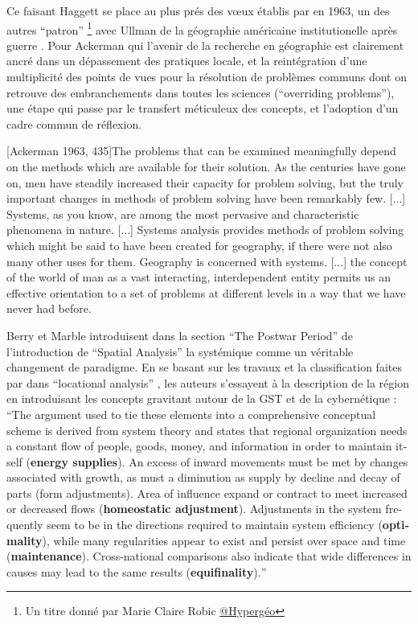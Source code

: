 Ce faisant Haggett se place au plus prés des vœux établis par \textcite{Ackerman1963} en 1963, un des autres \enquote{patron} \footnote{Un titre donné par Marie Claire Robic \href{http://www.hypergeo.eu/spip.php?article469}{@Hypergéo}} avec Ullman de la géographie américaine institutionelle après guerre . Pour Ackerman qui l'avenir de la recherche en géographie est clairement ancré dans un dépassement des pratiques locale, et la reintégration d'une multiplicité des points de vues pour la résolution de problèmes communs dont on retrouve des embranchements dans toutes les sciences (\foreignquote{english}{overriding problems}), une étape qui passe par le transfert méticuleux des concepts, et l'adoption d'un cadre commun de réflexion.

[Ackerman 1963, 435]{The problems that can be examined meaningfully depend on the methods which are available for their solution. As the centuries have gone on, men have steadily increased their capacity for problem solving, but the truly important changes in methods of problem solving have been remarkably few. [...] Systems, as you know, are among the most pervasive and characteristic phenomena in nature. [...] Systems analysis provides methods of problem solving which might be said to have been created for geography, if there were not also many other uses for them. Geography is concerned with systems. [...] the concept of the world of man as a vast interacting, interdependent entity permits us an effective orientation to a set of problems at different levels in a way that we have never had before.}

Berry et Marble introduisent dans la section \foreignquote{english}{The Postwar Period} de l'introduction de \foreignquote{english}{Spatial Analysis} la systémique comme un véritable changement de paradigme. En se basant sur les travaux et la classification faites par \textcite{Haggett1965} dans \foreignquote{english}{locational analysis} , les auteurs s'essayent à la description de la région en introduisant les concepts gravitant autour de la GST et de la cybernétique : \foreignquote{english}{The argument used to tie these elements into a comprehensive conceptual scheme is derived from system theory and states that regional organization needs a constant flow of people, goods, money, and information in order to maintain itself (\textbf{energy supplies}). An excess of inward movements must be met by changes associated with growth, as must a diminution as supply by decline and decay of parts (form adjustments). Area of influence expand or contract to meet increased or decreased flows (\textbf{homeostatic adjustment}). Adjustments in the system frequently seem to be in the directions required to maintain system efficiency (\textbf{optimality}), while many regularities appear to exist and persist over space and time (\textbf{maintenance}). Cross-national comparisons also indicate that wide differences in causes may lead to the same results (\textbf{equifinality}).}

